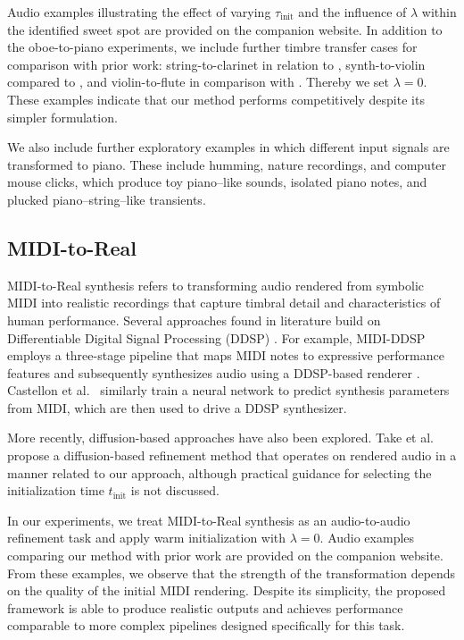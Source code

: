 Audio examples illustrating the effect of varying $\tau_\text{init}$ and the influence of $\lambda$ within the identified sweet spot are provided on the companion website. In addition to the oboe-to-piano experiments, we include further timbre transfer cases for comparison with prior work: string-to-clarinet in relation to \cite{baoueb2024wavetransferflexibleendtoendmultiinstrument, comanducci2023timbretransferusingimagetoimage}, synth-to-violin compared to \cite{lee2026diffusiontimbretransfermutual}, and violin-to-flute in comparison with \cite{mancusi2025latentdiffusionbridgesunsupervised}. Thereby we set $\lambda = 0$. These examples indicate that our method performs competitively despite its simpler formulation.

We also include further exploratory examples in which different input signals are transformed to piano. These include humming, nature recordings, and computer mouse clicks, which produce toy piano–like sounds, isolated piano notes, and plucked piano–string–like transients.

\subsection{MIDI-to-Real}
MIDI-to-Real synthesis refers to transforming audio rendered from symbolic MIDI into realistic recordings that capture timbral detail and characteristics of human performance. Several approaches found in literature build on Differentiable Digital Signal Processing (DDSP) \cite{engel2020ddspdifferentiabledigitalsignal}. For example, MIDI-DDSP employs a three-stage pipeline that maps MIDI notes to expressive performance features and subsequently synthesizes audio using a DDSP-based renderer \cite{wu2022mididdspdetailedcontrolmusical}. Castellon et al.~\cite{castellonRealisticMIDIInstrument} similarly train a neural network to predict synthesis parameters from MIDI, which are then used to drive a DDSP synthesizer. 

More recently, diffusion-based approaches have also been explored. Take et al.~\cite{take2025annotationfreemiditoaudiosynthesisconcatenative} propose a diffusion-based refinement me\-thod that operates on rendered audio in a manner related to our approach, although practical guidance for selecting the initialization time $t_\text{init}$ is not discussed.

In our experiments, we treat MIDI-to-Real synthesis as an audio-to-audio refinement task and apply warm initialization with $\lambda = 0$. Audio examples comparing our method with prior work are provided on the companion website.  From these examples, we observe that the strength of the transformation depends on the quality of the initial MIDI rendering. Despite its simplicity, the proposed framework is able to produce realistic outputs and achie\-ves performance comparable to more complex pipelines designed specifically for this task.
